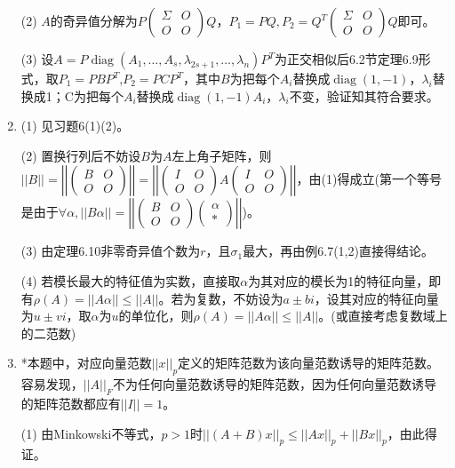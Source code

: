 \documentclass[a4paper,UTF8,fontset=windows]{ctexart}
\DeclareMathOperator{\diag}{diag}
\begin{document}
\begin{enumerate}
(2) $A$的奇异值分解为$P\begin{pmatrix}\Sigma&O\\O&O\end{pmatrix}Q$，$P_1=PQ,P_2=Q^T\begin{pmatrix}\Sigma&O\\O&O\end{pmatrix}Q$即可。

(3) 设$A=P\diag(A_1,\dots,A_s,\lambda_{2s+1},\dots,\lambda_n)P^T$为正交相似后6.2节定理6.9形式，取$P_1=PBP^T$,$P_2=PCP^T$，其中$B$为把每个$A_i$替换成$\diag(1,-1)$，$\lambda_i$替换成1；C为把每个$A_i$替换成$\diag(1,-1)A_i$，$\lambda_i$不变，验证知其符合要求。

\item
(1) 见习题6(1)(2)。

(2) 置换行列后不妨设$B$为$A$左上角子矩阵，则$||B||=\left|\left|\begin{pmatrix}B&O\\O&O\end{pmatrix}\right|\right|=\left|\left|\begin{pmatrix}I&O\\O&O\end{pmatrix}A\begin{pmatrix}I&O\\O&O\end{pmatrix}\right|\right|$，由(1)得成立(第一个等号是由于$\forall\alpha,||B\alpha||=\left|\left|\begin{pmatrix}B&O\\O&O\end{pmatrix}\begin{pmatrix}\alpha\\\ast\end{pmatrix}\right|\right|$)。

(3) 由定理6.10非零奇异值个数为$r$，且$\sigma_1$最大，再由例6.7(1,2)直接得结论。

(4) 若模长最大的特征值为实数，直接取$\alpha$为其对应的模长为1的特征向量，即有$\rho(A)=||A\alpha||\le||A||$。若为复数，不妨设为$a\pm bi$，设其对应的特征向量为$u\pm vi$，取$\alpha$为$u$的单位化，则$\rho(A)=||A\alpha||\le||A||$。(或直接考虑复数域上的二范数)

\item
*本题中，对应向量范数$||x||_p$定义的矩阵范数为该向量范数诱导的矩阵范数。容易发现，$||A||_F$不为任何向量范数诱导的矩阵范数，因为任何向量范数诱导的矩阵范数都应有$||I||=1$。

(1) 由Minkowski不等式，$p>1$时$||\left(A+B\right)x||_p\le||Ax||_p+||Bx||_p$，由此得证。


\end{enumerate}
\end{document}
